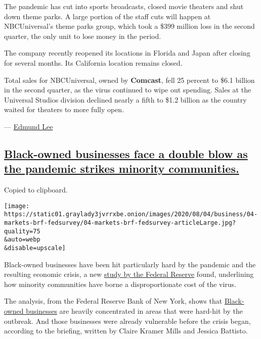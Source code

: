 The pandemic has cut into sports broadcasts, closed movie theaters and
shut down theme parks. A large portion of the staff cuts will happen at
NBCUniversal's theme parks group, which took a \$399 million loss in the
second quarter, the only unit to lose money in the period.

The company recently reopened its locations in Florida and Japan after
closing for several months. Its California location remains closed.

Total sales for NBCUniversal, owned by \textbf{Comcast}, fell 25 percent
to \$6.1 billion in the second quarter, as the virus continued to wipe
out spending. Sales at the Universal Studios division declined nearly a
fifth to \$1.2 billion as the country waited for theaters to more fully
open.

--- \href{https://www.nytimes3xbfgragh.onion/by/edmund-lee}{Edmund Lee}

\hypertarget{black-owned-businesses-face-a-double-blow-as-the-pandemic-strikes-minority-communities}{%
\subsection{\texorpdfstring{\protect\hyperlink{black-owned-businesses-face-a-double-blow-as-the-pandemic-strikes-minority-communities}{Black-owned
businesses face a double blow as the pandemic strikes minority
communities.}}{Black-owned businesses face a double blow as the pandemic strikes minority communities.}}\label{black-owned-businesses-face-a-double-blow-as-the-pandemic-strikes-minority-communities}}

Copied to clipboard.

\texttt{[image: https://static01.graylady3jvrrxbe.onion/images/2020/08/04/business/04-markets-brf-fedsurvey/04-markets-brf-fedsurvey-articleLarge.jpg?quality=75\\\&auto=webp\\\&disable=upscale]}

Black-owned businesses have been hit particularly hard by the pandemic
and the resulting economic crisis, a new
\href{https://www.newyorkfed.org/smallbusiness/small-business-credit-survey-2020}{study
by the Federal Reserve} found, underlining how minority communities have
borne a disproportionate cost of the virus.

The analysis, from the Federal Reserve Bank of New York, shows that
\href{https://www.nytimes3xbfgragh.onion/interactive/2020/06/18/us/coronavirus-black-owned-small-business.html}{Black-owned
businesses} are heavily concentrated in areas that were hard-hit by the
outbreak. And those businesses were already vulnerable before the crisis
began, according to the briefing, written by Claire Kramer Mills and
Jessica Battisto.

